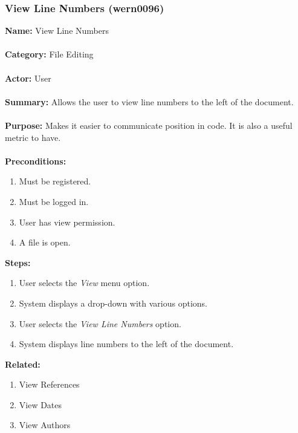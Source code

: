 \documentclass[11pt]{report}
\begin{document}
\subsubsection{View Line Numbers (wern0096)}
\begin{framed}
	\noindent\textbf{Name:} View Line Numbers \\ \\
	\textbf{Category:} File Editing \\ \\
	\textbf{Actor:} User \\ \\
	\textbf{Summary:} Allows the user to view line numbers to the left of the document. \\ \\
	\textbf{Purpose:} Makes it easier to communicate position in code. It is also a useful metric to have.\\ \\
	\textbf{Preconditions:} 
	\begin{enumerate}
		\item Must be registered.
		\item Must be logged in.
		\item User has view permission.
		\item A file is open.
	\end{enumerate}
	\textbf{Steps:}
	\begin{enumerate}
		\item User selects the \textit{View} menu option.
		\item System displays a drop-down with various options.
		\item User selects the \textit{View Line Numbers} option.
		\item System displays line numbers to the left of the document.
	\end{enumerate}
	\textbf{Related:}
	\begin{enumerate}
		\item View References
		\item View Dates
		\item View Authors
	\end{enumerate}
\end{framed}

\newpage
\end{document}
